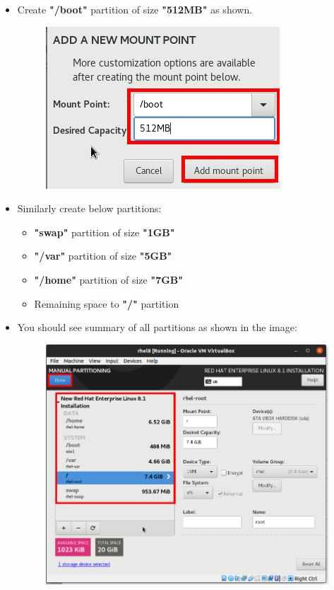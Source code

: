 \begin{flushleft}
\begin{itemize}
	\newpage
 	\item Create \textbf{"/boot"} partition of size \textbf{"512MB"} as shown.
	\begin{figure}[h!]
		\centering
		\includegraphics[scale=.4]{content/chapter18/images/image1.6.png}
	\end{figure}		

 	\item Similarly create below partitions:
 	\begin{itemize}
 		\item \textbf{"swap"} partition of size \textbf{"1GB"}
 		\item \textbf{"/var"} partition of size \textbf{"5GB"}
 		\item \textbf{"/home"} partition of size \textbf{"7GB"}
 		\item Remaining space to \textbf{"/"} partition
 	\end{itemize}

	\item You should see summary of all partitions as shown in the image:
	\begin{figure}[h!]
		\centering
		\includegraphics[scale=.2]{content/chapter18/images/summary.png}
		\label{primary_swap1}
	\end{figure}		



\end{itemize}
\end{flushleft}
